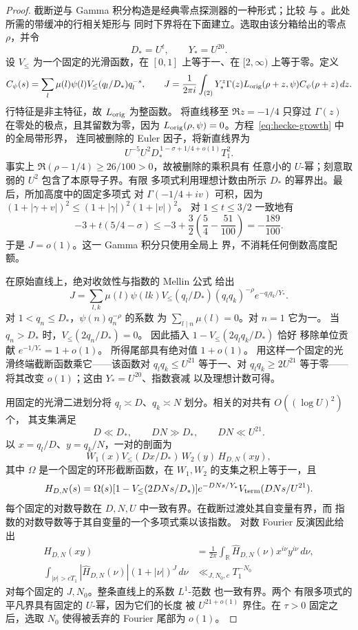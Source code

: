 \begin{proof}
截断逆与 Gamma 积分构造是经典零点探测器的一种形式；比较 \cite[附录 C]{MP}
与 \cite[第~13.1 节]{GM}。此处所需的带缓冲的行相关矩形与
同时下界将在下面建立。选取由该分箱给出的零点 \(\rho\)，并令
\[
 D_*=U^t,\qquad Y_*=U^{20}.
\]
设 \(V_{\le}\) 为一个固定的光滑函数，在
\([0,1]\) 上等于一、在 \([2,\infty)\) 上等于零。定义
\[
 C_\psi(s)=\sum_l\mu(l)\psi(l)V_{\le}(q_l/D_*)q_l^{-s},
 \qquad
 J=\frac1{2\pi i}\int_{(2)}
       Y_*^z\Gamma(z)L_{\rm orig}(\rho+z,\psi)
       C_\psi(\rho+z)\,dz.
\]
行特征是非主特征，故 \(L_{\rm orig}\) 为整函数。
将直线移至 \(\Re z=-1/4\) 只穿过
\(\Gamma(z)\) 在零处的极点，且其留数为零，因为
\(L_{\rm orig}(\rho,\psi)=0\)。方程~\eqref{eq:hecke-growth} 中的全局带形界，
连同被删除的 Euler 因子，将新直线界为
\[
 U^{-5}U^2D_*^{\,1-\sigma+1/4+o(1)}T_1^2.
\]
事实上 \(\Re(\rho-1/4)\ge26/100>0\)，故被删除的乘积具有
任意小的 \(U\)-幂；刻意取弱的
\(U^2\) 包含了本原导子界。有限
多项式利用理想计数由所示 \(D_*\) 的幂界出。最后，所加高度中的固定多项式
对 \(\Gamma(-1/4+iv)\) 可积，因为
\((1+|\gamma+v|)^2\le(1+|\gamma|)^2(1+|v|)^2\)。
对 \(1\le t\le3/2\) 一致地有
\[
 -3+t(5/4-\sigma)
 \le-3+\frac32\left(\frac54-\frac{51}{100}\right)
 =-\frac{189}{100}.
\]
于是 \(J=o(1)\)。这一 Gamma 积分只使用全局上
界，不消耗任何倒数高度配额。

在原始直线上，绝对收敛性与指数的 Mellin 公式
给出
\[
 J=\sum_{l,k}\mu(l)\psi(lk)V_{\le}(q_l/D_*)
       (q_lq_k)^{-\rho}e^{-q_lq_k/Y_*}.
\]
对 \(1<q_n\le D_*\)，\(\psi(n)q_n^{-\rho}\) 的系数
为 \(\sum_{l\mid n}\mu(l)=0\)。对 \(n=1\) 它为一。
当 \(q_n>D_*\) 时，\(V_{\le}(2q_n/D_*)=0\)。
因此插入 \(1-V_{\le}(2q_lq_k/D_*)\) 恰好
移除单位贡献 \(e^{-1/Y_*}=1+o(1)\)。
所得尾部具有绝对值 \(1+o(1)\)。
用这样一个固定的光滑终端截断函数乘它——该函数对
\(q_lq_k\le U^{21}\) 等于一、对 \(q_lq_k\ge2U^{21}\) 等于零——将其改变
\(o(1)\)；这由 \(Y_*=U^{20}\)、指数衰减
以及理想计数可得。

用固定的光滑二进划分将 \(q_l\asymp D\)、\(q_k\asymp N\)
划分。相关的对共有 \(O((\log U)^2)\) 个，
其支集满足
\[
 D\ll D_*,\qquad DN\gg D_*,\qquad DN\ll U^{21}.
\]
以 \(x=q_l/D\)、\(y=q_k/N\)，一对的剖面为
\[
 W_1(x)V_{\le}(Dx/D_*)\,W_2(y)\,H_{D,N}(xy),
\]
其中 \(\Omega\) 是一个固定的环形截断函数，在
\(W_1,W_2\) 的支集之积上等于一，且
\[
 H_{D,N}(s)=\Omega(s)
   [1-V_{\le}(2DNs/D_*)]e^{-DNs/Y_*}
   V_{\rm term}(DNs/U^{21}).
\]
每个固定的对数导数在
\(D,N,U\) 中一致有界。在截断过渡处其自变量有界，而
指数的对数导数等于其自变量的一个多项式乘以该指数。
对数 Fourier 反演因此给出
\[
 \begin{split}
 H_{D,N}(xy)&=\frac1{2\pi}\int_{\mathbb R}
      \widehat H_{D,N}(\nu)x^{i\nu}y^{i\nu}\,d\nu,\\
 \int_{|\nu|>cT_1}|\widehat H_{D,N}(\nu)|
       (1+|\nu|)^J\,d\nu&\ll_{J,N_0,c}T_1^{-N_0}
 \end{split}
\]
对每个固定的 \(J,N_0\)。整条直线上的系数 \(L^1\)-范数
也一致有界。两个
有限多项式的平凡界具有固定的 \(U\)-幂，因为它们的长度
被 \(U^{21+o(1)}\) 界住。在 \(\tau>0\) 固定之后，选取
\(N_0\) 使得被丢弃的 Fourier 尾部为 \(o(1)\)。


\end{proof}
